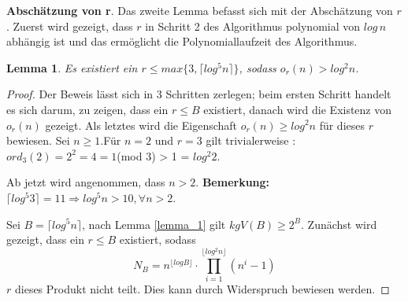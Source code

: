 \documentclass[12pt,oneside]{article}
\newtheorem{lemma}[theorem]{Lemma}
\theoremstyle{remark}
\theoremstyle{definition}
\begin{document}
\textbf{Abschätzung von r}.\newline\newline
Das zweite Lemma befasst sich mit der Abschätzung von $r$. Zuerst wird gezeigt, dass $r$ in Schritt 2 des Algorithmus polynomial von $log \, n$ abhängig ist und das ermöglicht die Polynomiallaufzeit des Algorithmus.  

\begin{lemma}
Es existiert ein $ r \leq max \{ 3, \lceil log^5 n \rceil \}$, sodass $o_{r}(n) > log^2 n$.
\end{lemma}

\begin{proof}
Der Beweis lässt sich in 3 Schritten zerlegen; beim ersten Schritt handelt es sich darum, zu zeigen, dass ein $r \leq B$ existiert, danach wird die Existenz von $o_{r}(n)$ gezeigt. Als letztes wird die Eigenschaft $o_{r}(n) \geq log^2 n$ für dieses $r$ bewiesen. 
Sei $n \geq 1$.\newline\newline Für $n = 2$ und $r = 3$ gilt trivialerweise :\newline\newline $ord_{3}(2) = 2^2 = 4 = 1 $(mod 3) > 1 = $log^2 2$.

Ab jetzt wird angenommen, dass $n > 2$.\newline\newline
\textbf{Bemerkung: } $\lceil log^5 3 \rceil = 11 \Rightarrow log^5 n > 10, \forall n > 2$.\newline

Sei $B = \lceil log^5 n \rceil$, nach Lemma \ref{lemma_1} gilt $kgV(B) \geq 2^B$. Zunächst wird gezeigt, dass   ein $r \leq B$ existiert, sodass
\begin{equation}\label{prod_cor}
     N_{B} = n^{\lfloor log B \rfloor } \cdot \prod_{i = 1}^{\lfloor log^2 n \rfloor} (n^i - 1)
\end{equation}
$r$ dieses Produkt nicht teilt. Dies kann durch Widerspruch bewiesen werden.


\end{proof}
\end{document}
